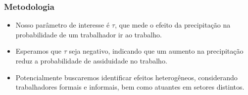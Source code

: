 \begin{frame}
    \frametitle{Metodologia}
    \begin{itemize}
        \item Nosso parâmetro de interesse é $\tau$, que mede o efeito da precipitação na probabilidade de um trabalhador ir ao trabalho.
        \item Esperamos que $\tau$ seja negativo, indicando que um aumento na precipitação reduz a probabilidade de assiduidade no trabalho.
        \item Potencialmente buscaremos identificar efeitos heterogêneos, considerando trabalhadores formais e informais, bem como atuantes em setores distintos.
    \end{itemize}
\end{frame}
